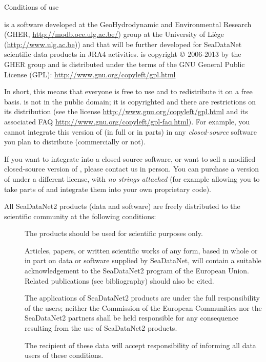 
\vspace*{\fill}

\begin{center}
\begin{minipage}[c]{.85\textwidth}

\Large{Conditions of use}
\vspace{1cm}
\normalsize


\vspace{.25cm}
\diva is a software developed at the GeoHydrodynamic and Environmental Research (GHER, \url{http://modb.oce.ulg.ac.be/}) group at the University of Liège (\url{http://www.ulg.ac.be})) and that will be further developed for SeaDataNet scientific data products in \textsf{JRA4} activities. \diva is copyright $\copyright$  2006-2013 by the GHER group and is distributed under the terms of the GNU General Public License (GPL): \url{http://www.gnu.org/copyleft/gpl.html} 

In short, this means that everyone is free to use \diva and to redistribute it on a free basis. \diva is not in the public domain; it is copyrighted and there are restrictions on its distribution (see the license \url{http://www.gnu.org/copyleft/gpl.html} and its associated FAQ \url{http://www.gnu.org/copyleft/gpl-faq.html}). For example, you cannot integrate this version of \diva (in full or in parts) in any \textit{closed-source} software you plan to distribute (commercially or not).

If you want to integrate \diva into a closed-source software, or want to sell a modified closed-source version of \diva, please contact us in person. You can purchase a version of \diva under a different license, with \textit{no strings attached} (for example allowing you to take parts of \diva and integrate them into your own proprietary code).

\vspace{.25cm}
All SeaDataNet2 products (data and software) are freely distributed to the scientific community at the following conditions: 

\begin{description}
\item[\checkmark] The products should be used for scientific purposes only.
\item[\checkmark] Articles, papers, or written scientific works of any form, based in whole or in part on data or software supplied by SeaDataNet, will contain a suitable acknowledgement to the SeaDataNet2 program of the European Union. Related publications (see bibliography) should also be cited.
\item[\checkmark] The applications of SeaDataNet2 products are under the full responsibility of the users; neither the Commission of the European Communities nor the SeaDataNet2 partners shall be held responsible for any consequence resulting from the use of SeaDataNet2 products. 
\item[\checkmark] The recipient of these data will accept responsibility of informing all data users of these conditions.
\end{description}


\end{minipage}
\end{center}

